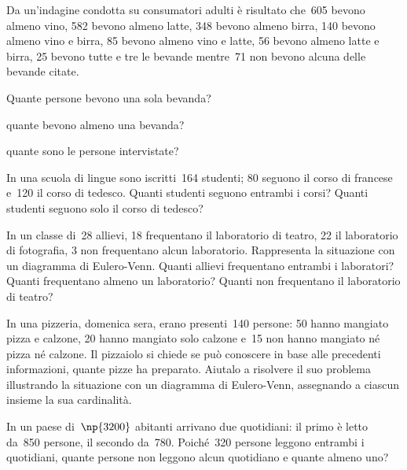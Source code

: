 \begin{esercizio}[\Ast]
\label{ese:5.82}
Da un'indagine condotta su consumatori adulti è
risultato che~605 bevono almeno vino, 582 bevono almeno latte, 348
bevono almeno birra, 140 bevono almeno vino e birra, 85 bevono almeno
vino e latte, 56 bevono almeno latte e birra, 25 bevono tutte e tre le
bevande mentre~71 non bevono alcuna delle bevande citate.
\begin{enumeratea}
\item Quante persone bevono una sola bevanda?
\item quante bevono almeno una bevanda?
\item quante sono le persone intervistate?
\end{enumeratea}
\end{esercizio}

\begin{esercizio}[\Ast]
\label{ese:5.83}
In una scuola di lingue sono iscritti~164 studenti; 80 seguono il
corso di francese e~120 il corso di tedesco. Quanti studenti seguono
entrambi i corsi? Quanti studenti seguono
solo il corso di tedesco?
\end{esercizio}

\begin{esercizio}[\Ast]
\label{ese:5.84}
In un classe di~28 allievi, 18 frequentano il laboratorio di teatro,
22 il laboratorio di fotografia, 3 non frequentano alcun laboratorio.
Rappresenta la situazione con un diagramma di Eulero-Venn. Quanti
allievi frequentano entrambi i laboratori? Quanti frequentano almeno un
laboratorio? Quanti non frequentano il laboratorio di teatro?
\end{esercizio}

\begin{esercizio}[\Ast]
\label{ese:5.85}
In una pizzeria, domenica sera, erano presenti~140 persone: 50 hanno
mangiato pizza e calzone, 20 hanno mangiato solo calzone e~15 non hanno
mangiato né pizza né calzone. Il pizzaiolo si chiede se può
conoscere in base alle precedenti informazioni, quante pizze ha
preparato. Aiutalo a risolvere il suo problema illustrando la
situazione con un diagramma di Eulero-Venn, assegnando a ciascun insieme la
sua cardinalità.
\end{esercizio}

\begin{esercizio}
\label{ese:5.86}
In un paese di~$\np{3200}$ abitanti arrivano due quotidiani: il primo è letto da~850
persone, il secondo da~780. Poiché~320 persone leggono entrambi i
quotidiani, quante persone non leggono alcun quotidiano e quante almeno uno?
\end{esercizio}

